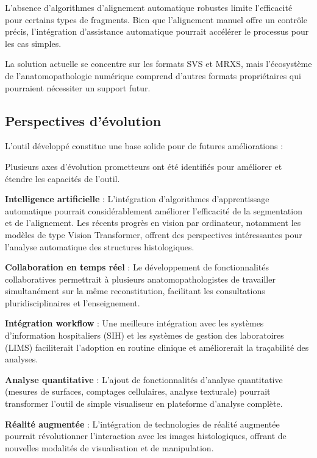\documentclass[12pt,a4paper]{report}
\begin{document}
\begin{}
\begin{}
\begin{}
\begin{}
L'absence d'algorithmes d'alignement automatique robustes limite l'efficacité pour certains types de fragments. Bien que l'alignement manuel offre un contrôle précis, l'intégration d'assistance automatique pourrait accélérer le processus pour les cas simples.

La solution actuelle se concentre sur les formats SVS et MRXS, mais l'écosystème de l'anatomopathologie numérique comprend d'autres formats propriétaires qui pourraient nécessiter un support futur.

\subsection{Perspectives d'évolution}

\begin{center}
L'outil développé constitue une base solide pour de futures améliorations :
\end{center}

\vspace{0.5em}

Plusieurs axes d'évolution prometteurs ont été identifiés pour améliorer et étendre les capacités de l'outil.

\textbf{Intelligence artificielle} : L'intégration d'algorithmes d'apprentissage automatique pourrait considérablement améliorer l'efficacité de la segmentation et de l'alignement. Les récents progrès en vision par ordinateur, notamment les modèles de type Vision Transformer, offrent des perspectives intéressantes pour l'analyse automatique des structures histologiques.

\textbf{Collaboration en temps réel} : Le développement de fonctionnalités collaboratives permettrait à plusieurs anatomopathologistes de travailler simultanément sur la même reconstitution, facilitant les consultations pluridisciplinaires et l'enseignement.

\textbf{Intégration workflow} : Une meilleure intégration avec les systèmes d'information hospitaliers (SIH) et les systèmes de gestion des laboratoires (LIMS) faciliterait l'adoption en routine clinique et améliorerait la traçabilité des analyses.

\textbf{Analyse quantitative} : L'ajout de fonctionnalités d'analyse quantitative (mesures de surfaces, comptages cellulaires, analyse texturale) pourrait transformer l'outil de simple visualiseur en plateforme d'analyse complète.

\textbf{Réalité augmentée} : L'intégration de technologies de réalité augmentée pourrait révolutionner l'interaction avec les images histologiques, offrant de nouvelles modalités de visualisation et de manipulation.


\end{}
\end{}
\end{}
\end{}
\end{document}
